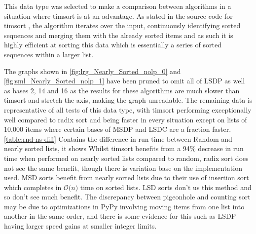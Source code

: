 \documentclass[12pt]{article}
\begin{document}
	This data type was selected to make a comparison between algorithms in a situation where timsort is at an advantage. As stated in the source code for timsort \cite{listsort}, the algorithm iterates over the input, continuously identifying sorted sequences and merging them with the already sorted items and as such it is highly efficient at sorting this data which is essentially a series of sorted sequences within a larger list.
	\par
	\pagebreak
	The graphs shown in \autoref{fig:lrg_Nearly_Sorted_nolp_0} and \autoref{fig:sml_Nearly_Sorted_nolp_1} have been pruned to omit all of LSD\textunderscore P as well as bases 2, 14 and 16 as the results for these algorithms are much slower than timsort and stretch the axis, making the graph unreadable. The remaining data is representative of all tests of this data type, with timsort performing exceptionally well compared to radix sort and being faster in every situation except on lists of 10,000 items where certain bases of MSD\textunderscore P and LSD\textunderscore C are a fraction faster.  	
	\autoref{table:rnd-ns-diff} Contains the difference in run time between Random and nearly sorted lists, it shows Whilst timsort benefits from a 94\% decrease in run time when performed on nearly sorted lists compared to random, radix sort does not see the same benefit, though there is variation base on the implementation used. MSD sorts benefit from nearly sorted lists due to their use of insertion sort which completes in $\mathcal{O}\textit{(n)}$ time on sorted lists. LSD sorts don't us this method and so don't see much benefit. The discrepancy between pigeonhole and counting sort may be due to optimizations in PyPy involving moving items from one list into another in the same order, and there is some evidence for this such as LSD\textunderscore P having larger speed gains at smaller integer limits.
\end{document}
